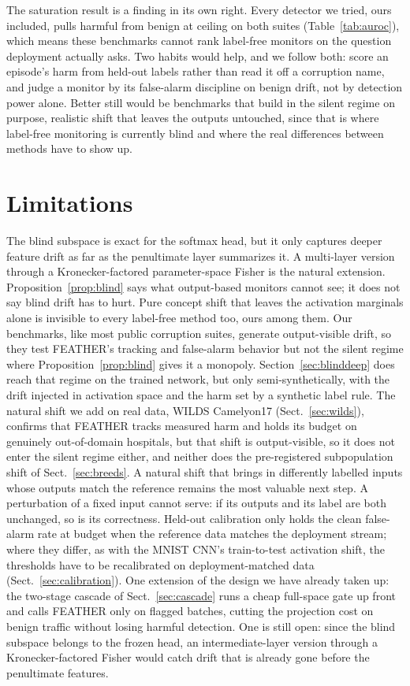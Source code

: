 \documentclass[acmsmall,screen]{acmart}
\theoremstyle{acmdefinition}
\begin{document}
The saturation result is a finding in its own right. Every detector we tried,
ours included, pulls harmful from benign at ceiling on both suites
(Table~\ref{tab:auroc}), which means these benchmarks cannot rank label-free
monitors on the question deployment actually asks. Two habits would help, and
we follow both: score an episode's harm from held-out labels rather than read
it off a corruption name, and judge a monitor by its false-alarm discipline on
benign drift, not by detection power alone. Better still would be benchmarks
that build in the silent regime on purpose, realistic shift that leaves the
outputs untouched, since that is where label-free monitoring is currently
blind and where the real differences between methods have to show up.

\section{Limitations}
\label{sec:limitations}

The blind subspace is exact for the softmax head, but it only captures deeper
feature drift as far as the penultimate layer summarizes it. A multi-layer
version through a Kronecker-factored parameter-space Fisher
\cite{martens2015kfac} is the natural extension. Proposition~\ref{prop:blind}
says what output-based monitors cannot see; it does not say blind drift has to
hurt. Pure concept shift that leaves the activation marginals alone is
invisible to every label-free method too, ours among them. Our benchmarks,
like most public corruption suites, generate output-visible drift, so they
test FEATHER's tracking and false-alarm behavior but not the silent regime
where Proposition~\ref{prop:blind} gives it a monopoly.
Section~\ref{sec:blinddeep} does reach that regime on the trained network, but
only semi-synthetically, with the drift injected in activation space and the
harm set by a synthetic label rule. The natural shift we add on real data,
WILDS Camelyon17 (Sect.~\ref{sec:wilds}), confirms that FEATHER tracks measured
harm and holds its budget on genuinely out-of-domain hospitals, but that shift
is output-visible, so it does not enter the silent regime either, and
neither does the pre-registered subpopulation shift of
Sect.~\ref{sec:breeds}. A natural shift that brings in differently
labelled inputs whose outputs match the reference remains the most
valuable next step. A perturbation of a fixed
input cannot serve: if its outputs and its label are both unchanged, so is
its correctness. Held-out calibration only holds the clean false-alarm
rate at budget when the reference data matches the deployment stream; where
they differ, as with the MNIST CNN's train-to-test activation shift, the
thresholds have to be recalibrated on deployment-matched data
(Sect.~\ref{sec:calibration}). One extension of the design we have
already taken up: the two-stage cascade of Sect.~\ref{sec:cascade} runs a cheap
full-space gate up front and calls FEATHER only on flagged batches, cutting the
projection cost on benign traffic without losing harmful detection. One is
still open: since the blind subspace belongs to the frozen head, an
intermediate-layer version through a Kronecker-factored Fisher
\cite{martens2015kfac} would catch drift that is already gone before the
penultimate features.
\end{document}
